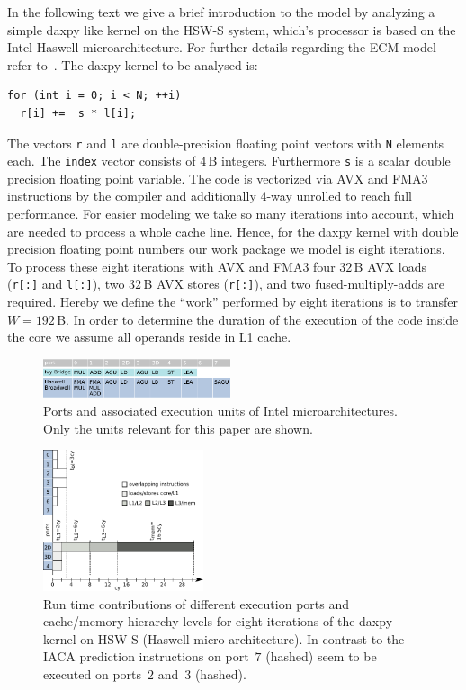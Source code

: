 In the following text we give a brief introduction to the model by analyzing a
simple daxpy like kernel on the HSW-S system, which's processor is based on the Intel Haswell
microarchitecture. For further details regarding the ECM model refer
to~\cite{stengel-2015}.  The daxpy kernel to be analysed is:
%
\begin{lstlisting}
for (int i = 0; i < N; ++i) 
  r[i] +=  s * l[i];
\end{lstlisting}
%
The vectors \verb'r' and \verb'l' are double-precision floating point vectors
with \verb'N' elements each. 
The \verb'index' vector consists of $4$\,B integers.
Furthermore \verb's' is a scalar double precision floating point variable.
%
The code is vectorized via AVX and FMA3 instructions by the compiler and
additionally $4$-way unrolled to reach full performance.
%
For easier modeling we take so many iterations into account, which are needed to
process a whole cache line.
Hence, for the daxpy kernel with double precision floating point numbers our
work package we model is eight iterations.
%
To process these eight iterations with AVX and FMA3 four $32$\,B AVX loads (\verb|r[:]| and
\verb|l[:]|), two
$32$\,B AVX stores (\verb'r[:]'), and two fused-multiply-adds are required.
%
Hereby we define the ``work'' performed by eight iterations is to transfer $W = 192$\,B.
%
In order to determine the duration of the execution of the code inside
the core we assume all operands reside in L1 cache.

\begin{figure}[tp]
  \centering
  \includegraphics[width=0.49\textwidth,clip=true]{images/IntelMicroArchPorts}
  \caption{Ports and associated execution units of Intel microarchitectures.
Only the units relevant for this paper are shown.}
  \label{fig:ports}
\end{figure}

\begin{figure}[tp]
  \centering
  \includegraphics[width=0.42\textwidth,clip=true]{images/ecm-hsw-daxpy}
  \caption{Run time contributions of different execution ports and cache/memory
hierarchy levels for eight iterations of the daxpy kernel on HSW-S (Haswell micro
architecture). In contrast to the IACA prediction instructions on port~$7$
(hashed) seem to be executed on ports~$2$ and~$3$ (hashed).}
  \label{fig:daxpy:ecm}
\end{figure}

